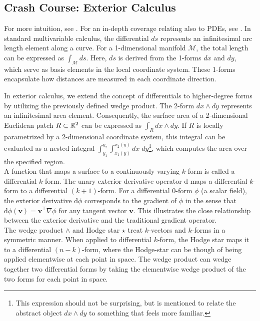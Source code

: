 \subsection*{Crash Course: Exterior Calculus}
For more intuition, see \cite{craneDDG}. For an in-depth coverage relating also to PDEs, see \cite{bryant1991exterior}. In standard multivariable calculus, the differential $ds$ represents an infinitesimal arc length element along a curve. For a 1-dimensional manifold $\mathcal{M}$, the total length can be expressed as $\int_{\mathcal{M}} ds$. Here, $ds$ is derived from the 1-forms $dx$ and $dy$, which serve as basis elements in the local coordinate system. These 1-forms encapsulate how distances are measured in each coordinate direction.

In exterior calculus, we extend the concept of differentials to higher-degree forms by utilizing the previously defined wedge product. The 2-form $dx \wedge dy$ represents an infinitesimal area element. Consequently, the surface area of a 2-dimensional Euclidean patch $R \subset \mathbb{R}^2$ can be expressed as $\int_{R} dx \wedge dy$. If $R$ is locally parametrized by a 2-dimensional coordinate system, this integral can be evaluated as a nested integral $\int_{y_1}^{y_2}\int_{x_1(y)}^{x_2(y)} dx \; dy$\footnote{This expression should not be surprising, but is mentioned to relate the abstract object $dx \wedge dy$ to something that feels more familiar.}, which computes the area over the specified region.
\\
A function that maps a surface to a continuously varying $k$-form is called a differential $k$-form. The unary exterior derivative operator $\text{d}$ maps a differential $k$-form to a differential $(k+1)$-form. For a differential $0$-form $\phi$ (a scalar field), the exterior derivative $\text{d}\phi$ corresponds to the gradient of $\phi$ in the sense that 
$\text{d}\phi(\mathbf{v}) = \mathbf{v} ^\top \nabla \phi$ for any tangent vector $\mathbf{v}$. This illustrates the close relationship between the exterior derivative and the traditional gradient operator. 
\\
The wedge product $\wedge$ and Hodge star $\star$ treat $k$-vectors and $k$-forms in a symmetric manner. When applied to differential $k$-form, the Hodge star maps it to a differential $(n-k)$-form, where the Hodge-star can be though of being applied elementwise at each point in space. The wedge product can wedge together two differential forms by taking the elementwise wedge product of the two forms for each point in space.
\\
